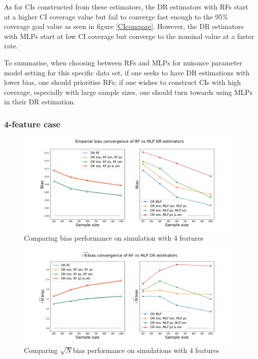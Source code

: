 \documentclass[12pt,twoside]{article}
\begin{document}
As for CIs constructed from these estimators, the DR estimators with RFs start at a higher CI coverage value but fail to converge fast enough to the 95\% coverage goal value as seen in figure \ref{CIcompare}. However, the DR estimators with MLPs start at low CI coverage but converge to the nominal value at a faster rate.

To summarise, when choosing between RFs and MLPs for nuisance parameter model setting for this specific data set, if one seeks to have DR estimations with lower bias, one should prioritise RFs; if one wishes to construct CIs with high coverage, especially with large sample sizes, one should turn towards using MLPs in their DR estimation.

\subsubsection{4-feature case} \label{4 features}

\begin{figure}[h!]
    \centering
    \includegraphics[width = 0.9\columnwidth]{figures/biascompare_moreW.png}
    \caption{Comparing bias performance on simulation with 4 features}
    \label{biascompare_moreW}
\end{figure}

\begin{figure}[h!]
    \centering
    \includegraphics[width = 0.9\columnwidth]{figures/sqrtncompare_moreW.png}
    \caption{Comparing $\sqrt{N}$bias performance on simulations with 4 features}
    \label{sqrtncompare_moreW}
\end{figure}
\end{document}
